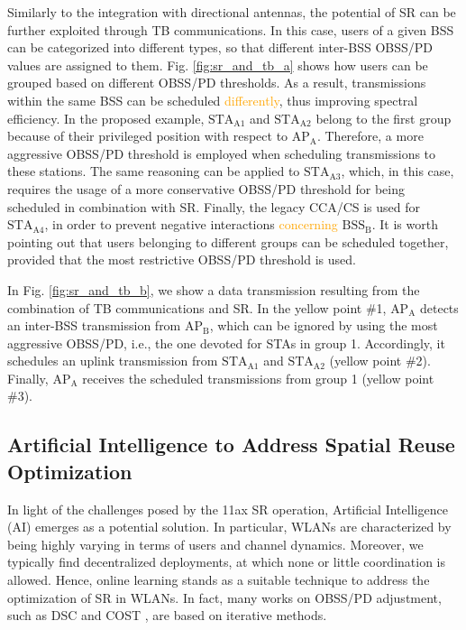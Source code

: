 \documentclass{ieeeaccess}
\begin{document}
Similarly to the integration with directional antennas, the potential of SR can be further exploited through TB communications. In this case, users of a given BSS can be categorized into different types, so that different inter-BSS OBSS/PD values are assigned to them. Fig. \ref{fig:sr_and_tb_a} shows how users can be grouped based on different OBSS/PD thresholds. As a result, transmissions within the same BSS can be scheduled \textcolor{orange}{differently}, thus improving spectral efficiency. In the proposed example, $\text{STA}_\text{A1}$ and $\text{STA}_\text{A2}$ belong to the first group because of their privileged position with respect to $\text{AP}_\text{A}$. Therefore, a more aggressive OBSS/PD threshold is employed when scheduling transmissions to these stations. The same reasoning can be applied to $\text{STA}_\text{A3}$, which, in this case, requires the usage of a more conservative OBSS/PD threshold for being scheduled in combination with SR. Finally, the legacy CCA/CS is used for $\text{STA}_\text{A4}$, in order to prevent negative interactions \textcolor{orange}{concerning} $\text{BSS}_\text{B}$. It is worth pointing out that users belonging to different groups can be scheduled together, provided that the most restrictive OBSS/PD threshold is used. 

In Fig. \ref{fig:sr_and_tb_b}, we show a data transmission resulting from the combination of TB communications and SR. In the yellow point \#1, $\text{AP}_\text{A}$ detects an inter-BSS transmission from $\text{AP}_\text{B}$, which can be ignored by using the most aggressive OBSS/PD, i.e., the one devoted for STAs in group 1. Accordingly, it schedules an uplink transmission from $\text{STA}_\text{A1}$ and $\text{STA}_\text{A2}$ (yellow point \#2). Finally, $\text{AP}_\text{A}$ receives the scheduled transmissions from group 1 (yellow point \#3).

\subsection{Artificial Intelligence to Address Spatial Reuse Optimization}
In light of the challenges posed by the 11ax SR operation, Artificial Intelligence (AI) emerges as a potential solution. In particular, WLANs are characterized by being highly varying in terms of users and channel dynamics. Moreover, we typically find decentralized deployments, at which none or little coordination is allowed. Hence, online learning stands as a suitable technique to address the optimization of SR in WLANs. In fact, many works on OBSS/PD adjustment, such as DSC \cite{smith2015dynamic} and COST \cite{selinis2018control}, are based on iterative methods. 
\end{document}
